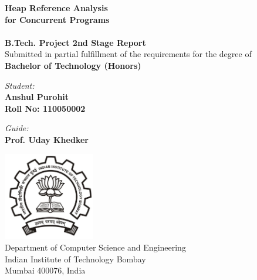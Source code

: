 \begin{titlepage}
\begin{center}

{\Huge \bfseries
Heap Reference Analysis \\
for Concurrent Programs\\
}~\\[1cm]


{\large \bfseries
B.Tech. Project 2nd Stage Report
}~\\[0.40cm]

{
Submitted in partial fulfillment of the requirements for the degree of
}~\\[0.20cm]

{\large \bfseries
Bachelor of Technology (Honors)
}\\[2.75cm]
\end{center}

\begin{multicols}{2}
\begin{flushleft}
{\large
\textit{Student:} \\
\textbf{Anshul Purohit} \\
\textbf{Roll No: 110050002}
}
\end{flushleft}
\columnbreak
\begin{flushright}
{\large
\textit{Guide:} \\
\textbf{Prof. Uday Khedker}
}
\end{flushright}
\end{multicols}

\vfill

\begin{center}
\includegraphics[width=4cm]{Figures/iitbblack.jpg}~\\[1cm]

{\large
Department of Computer Science and Engineering\\
Indian Institute of Technology Bombay\\
Mumbai 400076, India\\
}

\end{center}
\end{titlepage}